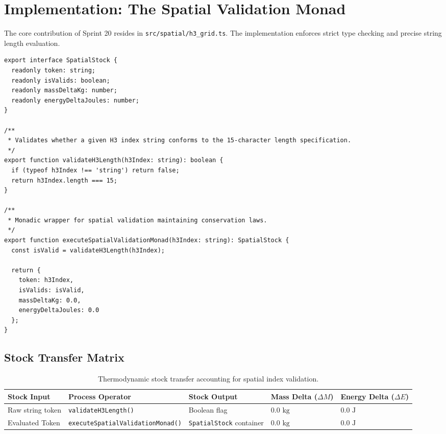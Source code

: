 \documentclass[11pt, a4paper]{article}
\begin{document}
\section{Implementation: The Spatial Validation Monad}
The core contribution of Sprint 20 resides in \texttt{src/spatial/h3\_grid.ts}. The implementation enforces strict type checking and precise string length evaluation.

\begin{verbatim}
export interface SpatialStock {
  readonly token: string;
  readonly isValids: boolean;
  readonly massDeltaKg: number;
  readonly energyDeltaJoules: number;
}

/**
 * Validates whether a given H3 index string conforms to the 15-character length specification.
 */
export function validateH3Length(h3Index: string): boolean {
  if (typeof h3Index !== 'string') return false;
  return h3Index.length === 15;
}

/**
 * Monadic wrapper for spatial validation maintaining conservation laws.
 */
export function executeSpatialValidationMonad(h3Index: string): SpatialStock {
  const isValid = validateH3Length(h3Index);
  
  return {
    token: h3Index,
    isValids: isValid,
    massDeltaKg: 0.0,
    energyDeltaJoules: 0.0
  };
}
\end{verbatim}

\subsection{Stock Transfer Matrix}
\begin{table}[h]
\centering
\begin{tabular}{|l|l|l|l|l|}
\hline
\textbf{Stock Input} & \textbf{Process Operator} & \textbf{Stock Output} & \textbf{Mass Delta ($\Delta M$)} & \textbf{Energy Delta ($\Delta E$)} \\ \hline
Raw string token & \texttt{validateH3Length()} & Boolean flag & $0.0 \text{ kg}$ & $0.0 \text{ J}$ \\ \hline
Evaluated Token & \texttt{executeSpatialValidationMonad()} & \texttt{SpatialStock} container & $0.0 \text{ kg}$ & $0.0 \text{ J}$ \\ \hline
\end{tabular}
\caption{Thermodynamic stock transfer accounting for spatial index validation.}
\label{tab:stock_transfer}
\end{table}
\end{document}
